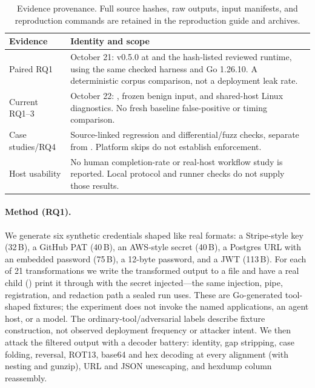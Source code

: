 \documentclass[10pt,twocolumn]{article}
\newcommand{\code}[1]{\textup{\texttt{\detokenize{#1}}}}
\begin{document}
\begin{table}[tp]
\centering\small
\begin{tabularx}{\columnwidth}{@{}lX@{}}
\toprule
Evidence & Identity and scope \\
\midrule
Paired RQ1 & October 21: v0.5.0 at \code{d16e04b} and the hash-listed reviewed
runtime, using the same checked harness and Go 1.26.10. A deterministic
corpus comparison, not a deployment leak rate. \\
Current RQ1--3 & October 22: \code{a4ab72e}, frozen benign input, and shared-host
Linux diagnostics. No fresh baseline false-positive or timing comparison. \\
Case studies/RQ4 & Source-linked regression and differential/fuzz checks,
separate from \code{paper/eval}. Platform skips do not establish enforcement. \\
Host usability & No human completion-rate or real-host workflow study is
reported. Local protocol and runner checks do not supply those results. \\
\bottomrule
\end{tabularx}
\caption{Evidence provenance. Full source hashes, raw outputs, input manifests,
and reproduction commands are retained in the reproduction guide and archives.}
\label{tab:evidence}
\end{table}

\paragraph{Method (RQ1).} We generate six synthetic credentials shaped like real
formats: a Stripe-style key (32\,B), a GitHub PAT (40\,B), an AWS-style secret
(40\,B), a Postgres URL with an embedded password (75\,B), a 12-byte password,
and a JWT (113\,B). For each of 21 transformations we write the transformed
output to a file and have a real child (\code{cat}) print it through
\code{runner.Run} with the secret injected---the same injection, pipe,
registration, and redaction path a sealed run uses. These are Go-generated
tool-shaped fixtures; the experiment does not invoke the named applications,
an agent host, or a model. The ordinary-tool/adversarial labels describe fixture
construction, not observed deployment frequency or attacker intent.
We then attack the filtered output with a decoder battery: identity, gap stripping, case
folding, reversal, ROT13, base64 and hex decoding at every alignment (with
nesting and gunzip), URL and JSON unescaping, and hexdump column reassembly.
\end{document}
